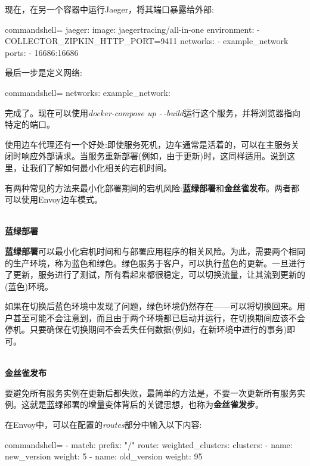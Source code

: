 现在，在另一个容器中运行Jaeger，将其端口暴露给外部:

\begin{tcblisting}{commandshell={}}
jaeger:
  image: jaegertracing/all-in-one
  environment:
    - COLLECTOR_ZIPKIN_HTTP_PORT=9411
  networks:
    - example_network
  ports:
    - 16686:16686

\end{tcblisting}

最后一步是定义网络:

\begin{tcblisting}{commandshell={}}
  networks:
    example_network: {}
\end{tcblisting}

完成了。现在可以使用\textit{docker-compose up -\,-build}运行这个服务，并将浏览器指向特定的端口。

使用边车代理还有一个好处:即使服务死机，边车通常是活着的，可以在主服务关闭时响应外部请求。当服务重新部署(例如，由于更新)时，这同样适用。说到这里，让我们了解如何最小化相关的宕机时间。


有两种常见的方法来最小化部署期间的宕机风险:\textbf{蓝绿部署}和\textbf{金丝雀发布}。两者都可以使用Envoy边车模式。

\hspace*{\fill} \\ %
\noindent
\textbf{蓝绿部署}

\textbf{蓝绿部署}可以最小化宕机时间和与部署应用程序的相关风险。为此，需要两个相同的生产环境，称为蓝色和绿色。绿色服务于客户，可以执行蓝色的更新。一旦进行了更新，服务进行了测试，所有看起来都很稳定，可以切换流量，让其流到更新的(蓝色)环境。

如果在切换后蓝色环境中发现了问题，绿色环境仍然存在——可以将切换回来。用户甚至可能不会注意到，而且由于两个环境都已启动并运行，在切换期间应该不会停机。只要确保在切换期间不会丢失任何数据(例如，在新环境中进行的事务)即可。

\hspace*{\fill} \\ %
\noindent
\textbf{金丝雀发布}

要避免所有服务实例在更新后都失败，最简单的方法是，不要一次更新所有服务实例。这就是蓝绿部署的增量变体背后的关键思想，也称为\textbf{金丝雀发步}。

在Envoy中，可以在配置的\textit{routes}部分中输入以下内容:

\begin{tcblisting}{commandshell={}}
- match:
    prefix: "/"
  route:
    weighted_clusters:
      clusters:
      - name: new_version
        weight: 5
      - name: old_version
        weight: 95
\end{tcblisting}

